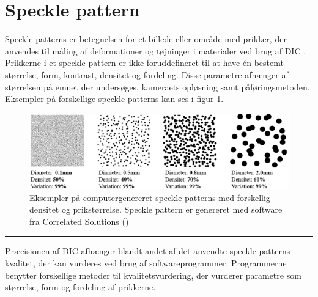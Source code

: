 \section{Speckle pattern} \label{Speckle pattern} 
Speckle patterns er betegnelsen for et billede eller område med prikker, der anvendes til måling af deformationer og tøjninger i materialer ved brug af DIC \parencite{Dong2017ACorrelation}. Prikkerne i et speckle pattern er ikke foruddefineret til at have én bestemt størrelse, form, kontrast, densitet og fordeling. Disse parametre afhænger af størrelsen på emnet der undersøges, kameraets opløsning samt påføringsmetoden. Eksempler på forskellige speckle patterns kan ses i figur \ref{fig:speckle pattern}.\\

\begin{figure}[H]
    \centering
    \includegraphics[width=\linewidth]{Sections/2 Problemanalyse/Media/speckle pattern forskellige.png}
    \caption{Eksempler på computergenereret speckle patterns med forskellig densitet og prikstørrelse. Speckle pattern er genereret med software fra Correlated Solutions (\cite{CorrelatedSolutions2025SpeckleInc.})}
    \label{fig:speckle pattern}
\end{figure} \plainbreak{-0.5}

Præcisionen af DIC afhænger blandt andet af det anvendte speckle patterns kvalitet, der kan vurderes ved brug af softwareprogrammer. Programmerne benytter forskellige metoder til kvalitetsvurdering, der vurderer parametre som størrelse, form og fordeling af prikkerne. 